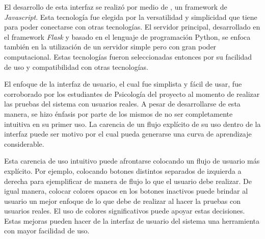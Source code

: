 El desarrollo de esta interfaz se realizó por medio de , un framework de \textit{Javascript}. Esta tecnología fue elegida por la versatilidad y simplicidad que tiene para poder conectarse con otras tecnologías. El servidor principal, desarrollado en el framework \textit{Flask} y basado en el lenguaje de programación Python, se enfoca también en la utilización de un servidor simple pero con gran poder computacional. Estas tecnologías fueron seleccionadas entonces por su facilidad de uso y compatibilidad con otras tecnologías. 

El enfoque de la interfaz de usuario, el cual fue simplista y fácil de usar, fue corroborado por los estudiantes de Psicología del proyecto al momento de realizar las pruebas del sistema con usuarios reales. A pesar de desarrollarse de esta manera, se hizo énfasis por parte de los mismos de no ser completamente intuitiva en su primer uso. La carencia de un flujo explícito de su uso dentro de la interfaz puede ser motivo por el cual pueda generarse una curva de aprendizaje considerable. 

Esta carencia de uso intuitivo puede afrontarse colocando un flujo de usuario más explícito. Por ejemplo, colocando botones distintos separados de izquierda a derecha para ejemplificar de manera de flujo lo que el usuario debe realizar. De igual manera, colocar colores opacos en los botones inactivos puede brindar al usuario un mejor enfoque de lo que debe de realizar al hacer la pruebas con usuarios reales. El uso de colores significativos puede apoyar estas decisiones. Estas mejoras pueden hacer de la interfaz de usuario del sistema una herramienta con mayor facilidad de uso. 


